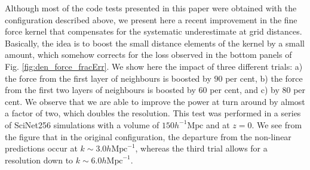 \documentclass[useAMS,usenatbib]{mn2e}
\begin{document}
Although most of the code tests presented in this paper were obtained with the configuration described above, 
we present here a recent improvement in the fine force kernel that compensates for the systematic underestimate
at grid distances. Basically, the idea is to boost the small distance elements of the kernel by a small amount,
which somehow corrects for the loss observed in the bottom panels of Fig. \ref{fig:den_force_fracErr}.
We show here the impact of three different trials: a) the force from the first layer of neighbours is boosted by $90$ per cent, b)
the force from the first two layers of neighbours is boosted by $60$ per cent, and c) by $80$ per cent.
We observe that we are able to improve the power at turn around by almost a factor of two, which doubles the resolution.  
This test was performed in a series of SciNet256 simulations with a volume of $150 h^{-1} \mbox{Mpc}$ and at $z=0$.
We see from the figure that in the original configuration, the departure from the non-linear predictions occur at $k\sim 3.0 h\mbox{Mpc}^{-1}$,
whereas the third trial allows for a resolution down to $k\sim 6.0 h\mbox{Mpc}^{-1}$. 
\end{document}
